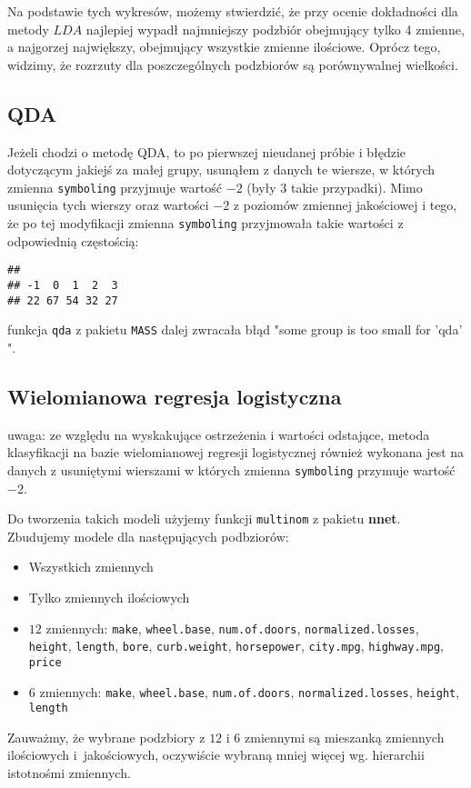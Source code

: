 \documentclass[12pt, a4paper]{article}\usepackage[]{graphicx}\usepackage[]{xcolor}
\makeatletter
\newenvironment{kframe}{%
 \def\at@end@of@kframe{}%
 \ifinner\ifhmode%
  \def\at@end@of@kframe{\end{minipage}}%
  \begin{minipage}{\columnwidth}%
 \fi\fi%
 \def\FrameCommand##1{\hskip\@totalleftmargin \hskip-\fboxsep
 \colorbox{shadecolor}{##1}\hskip-\fboxsep
     \hskip-\linewidth \hskip-\@totalleftmargin \hskip\columnwidth}%
 \MakeFramed {\advance\hsize-\width
   \@totalleftmargin\z@ \linewidth\hsize
   \@setminipage}}%
 {\par\unskip\endMakeFramed%
 \at@end@of@kframe}
\newenvironment{knitrout}{}{} %
\makeatother
\begin{document}
Na podstawie tych wykresów, możemy stwierdzić, że przy ocenie dokładności dla metody $LDA$ najlepiej wypadł najmniejszy podzbiór obejmujący tylko 4 zmienne, a najgorzej największy, obejmujący wszystkie zmienne ilościowe. Oprócz tego, widzimy, że rozrzuty dla poszczególnych podzbiorów są porównywalnej wielkości.

\subsection{QDA}


Jeżeli chodzi o metodę QDA, to po pierwszej nieudanej próbie i błędzie dotyczącym jakiejś za małej grupy, usunąłem z danych te wiersze, w których zmienna \texttt{symboling} przyjmuje wartość $-2$ (były $3$ takie przypadki). Mimo usunięcia tych wierszy oraz wartości $-2$ z poziomów zmiennej jakościowej i tego, że po tej modyfikacji zmienna \texttt{symboling} przyjmowała takie wartości z odpowiednią częstością:
\begin{knitrout}
\color{fgcolor}\begin{kframe}
\begin{verbatim}
## 
## -1  0  1  2  3 
## 22 67 54 32 27
\end{verbatim}
\end{kframe}
\end{knitrout}
funkcja \texttt{qda} z pakietu \texttt{MASS} dalej zwracała błąd "some group is too small for 'qda' ".


\subsection{Wielomianowa regresja logistyczna}

uwaga: ze względu na wyskakujące ostrzeżenia i wartości odstające, metoda klasyfikacji na bazie wielomianowej regresji logistycznej również wykonana jest na danych z usuniętymi wierszami w których zmienna \texttt{symboling} przymuje wartość $-2$. 
\par Do tworzenia takich modeli użyjemy funkcji \texttt{multinom} z pakietu \textbf{nnet}. Zbudujemy modele dla następujących podbziorów:
\begin{itemize}
\item Wszystkich zmiennych
\item Tylko zmiennych ilościowych
\item $12$ zmiennych: \texttt{make}, \texttt{wheel.base}, \texttt{num.of.doors}, \texttt{normalized.losses}, \texttt{height}, \texttt{length}, \texttt{bore}, \texttt{curb.weight}, \texttt{horsepower}, \texttt{city.mpg}, \texttt{highway.mpg}, \texttt{price}
\item $6$ zmiennych: \texttt{make}, \texttt{wheel.base}, \texttt{num.of.doors}, \texttt{normalized.losses}, \texttt{height}, \texttt{length}
\end{itemize}
Zauważmy, że wybrane podzbiory z $12$ i $6$ zmiennymi są mieszanką zmiennych ilościowych i~jakościowych, oczywiście wybraną mniej więcej wg. hierarchii istotnośmi zmiennych.
\end{document}
